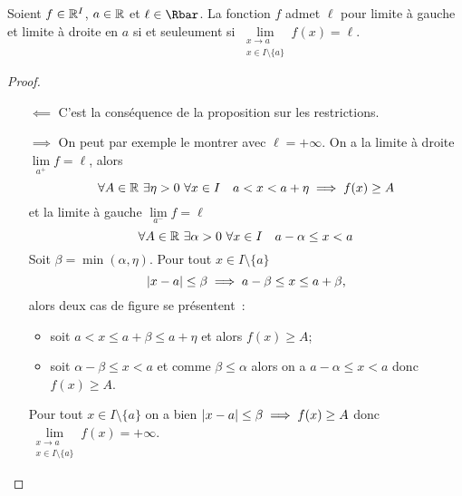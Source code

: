 \begin{prop}
  Soient $f \in \mathbb{R}^I$, $a \in \mathbb{R}$ et $\ell \in \Rbar$. La fonction $f$ admet $\ell$ pour limite à gauche et limite à droite en $a$ si et seuleument si $\lim\limits_{\begin{array}{c} x \to a \\ x \in I\setminus\{a\}\end{array}}f(x)=\ell$.
\end{prop}
\begin{proof}
  \begin{itemize}
  \item[$\impliedby$] C'est la conséquence de la proposition sur les restrictions.
  \item[$\implies$] On peut par exemple le montrer avec $\ell=+\infty$. On a la limite à droite $\lim\limits_{a^{+}}f=\ell$, alors
    \begin{equation}
      \forall A \in \mathbb{R} \ \exists \eta > 0 \ \forall x \in I \quad a < x < a + \eta \implies f(x) \geq A
    \end{equation}
    et la limite à gauche $\lim\limits_{a^{-}}f=\ell$
    \begin{equation}
      \forall A \in \R \ \exists \alpha > 0 \ \forall x \in I \quad a-\alpha \leq x < a
    \end{equation}
    Soit $\beta=\min(\alpha, \eta)$. Pour tout $x \in I\setminus\{a\}$
    \begin{equation}
      \left\lvert x-a\right\rvert \leq \beta \implies a-\beta \leq x \leq a+\beta,
    \end{equation}
    alors deux cas de figure se présentent~:
    \begin{itemize}
    \item soit $a < x \leq a+\beta \leq a + \eta$ et alors $f(x) \geq A$;
    \item soit $\alpha - \beta \leq x < a$ et comme $\beta \leq \alpha$ alors on a $a-\alpha \leq x < a$ donc $f(x) \geq A$.
    \end{itemize}
    Pour tout $x \in I\setminus\{a\}$ on a bien $\left\lvert x-a\right\rvert\leq \beta \implies f(x) \geq A$ donc $\lim\limits_{\begin{array}{l} x \to a \\ x \in I\setminus\{a\}\end{array}}f(x)=+\infty$.
  \end{itemize}
\end{proof}

